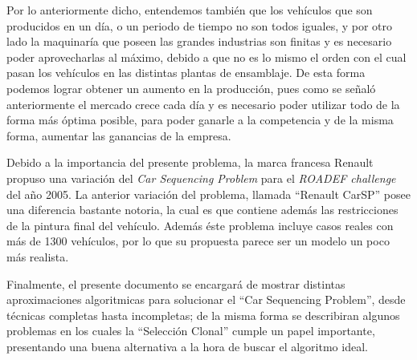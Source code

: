 Por lo anteriormente dicho, entendemos también que los vehículos que son producidos en un día,
o un periodo de tiempo no son todos iguales, y por otro lado la maquinaría que poseen las grandes industrias son
finitas y es necesario poder aprovecharlas al máximo, debido a que no es lo mismo el orden con el cual pasan
los vehículos en las distintas plantas de ensamblaje.
De esta forma podemos lograr obtener un aumento en la producción, pues como
se señaló anteriormente el mercado crece cada día y es necesario poder utilizar todo de la forma
más óptima posible, para poder ganarle a la competencia y de la misma forma, aumentar las ganancias
de la empresa.

Debido a la importancia del presente problema, la marca francesa Renault propuso una variación del \emph{Car Sequencing Problem}
para el \emph{ROADEF challenge} del año 2005. La anterior variación del problema, llamada ``Renault CarSP'' posee una
diferencia bastante notoria, la cual es que contiene además las restricciones de la pintura final del vehículo.
Además éste problema incluye casos reales con más de 1300 vehículos, por lo que su propuesta parece ser un modelo un poco
más realista.

Finalmente, el presente documento se encargará de mostrar distintas aproximaciones algoritmicas
para solucionar el ``Car Sequencing Problem'', desde técnicas completas hasta incompletas;
de la misma forma se describiran algunos problemas en los cuales la ``Selección Clonal'' cumple
un papel importante, presentando una buena alternativa a la hora de buscar el algoritmo ideal.
